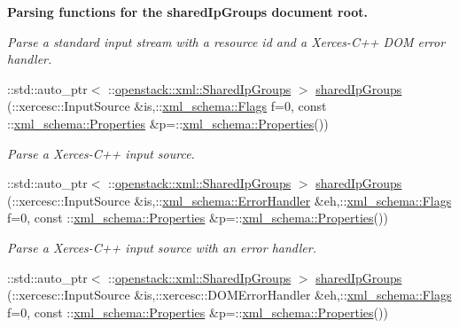 \begin{Indent}{\bf Parsing functions for the sharedIpGroups document root.}
\begin{DoxyCompactItemize}
\begin{DoxyCompactList}\small\item\em Parse a standard input stream with a resource id and a Xerces-\/C++ DOM error handler. \item\end{DoxyCompactList}\item 
::std::auto\_\-ptr$<$ ::\hyperlink{classopenstack_1_1xml_1_1SharedIpGroups}{openstack::xml::SharedIpGroups} $>$ \hyperlink{namespaceopenstack_1_1xml_a211f3fab7e8291970efefd9aa3fa8b4a}{sharedIpGroups} (::xercesc::InputSource \&is,::\hyperlink{namespacexml__schema_affb4c227cbd9aa7453dd1dc5a1401943}{xml\_\-schema::Flags} f=0, const ::\hyperlink{namespacexml__schema_ad27ce19a7ee1d3b1064092648898f64c}{xml\_\-schema::Properties} \&p=::\hyperlink{namespacexml__schema_ad27ce19a7ee1d3b1064092648898f64c}{xml\_\-schema::Properties}())
\begin{DoxyCompactList}\small\item\em Parse a Xerces-\/C++ input source. \item\end{DoxyCompactList}\item 
::std::auto\_\-ptr$<$ ::\hyperlink{classopenstack_1_1xml_1_1SharedIpGroups}{openstack::xml::SharedIpGroups} $>$ \hyperlink{namespaceopenstack_1_1xml_afff5bfc3d30dd6f81ba8b89efd949dcf}{sharedIpGroups} (::xercesc::InputSource \&is,::\hyperlink{namespacexml__schema_ab1c9361bfd3b404eaabf0c31eded79dc}{xml\_\-schema::ErrorHandler} \&eh,::\hyperlink{namespacexml__schema_affb4c227cbd9aa7453dd1dc5a1401943}{xml\_\-schema::Flags} f=0, const ::\hyperlink{namespacexml__schema_ad27ce19a7ee1d3b1064092648898f64c}{xml\_\-schema::Properties} \&p=::\hyperlink{namespacexml__schema_ad27ce19a7ee1d3b1064092648898f64c}{xml\_\-schema::Properties}())
\begin{DoxyCompactList}\small\item\em Parse a Xerces-\/C++ input source with an error handler. \item\end{DoxyCompactList}\item 
::std::auto\_\-ptr$<$ ::\hyperlink{classopenstack_1_1xml_1_1SharedIpGroups}{openstack::xml::SharedIpGroups} $>$ \hyperlink{namespaceopenstack_1_1xml_a87a069c8bf2815905223f9c46e41c2f2}{sharedIpGroups} (::xercesc::InputSource \&is,::xercesc::DOMErrorHandler \&eh,::\hyperlink{namespacexml__schema_affb4c227cbd9aa7453dd1dc5a1401943}{xml\_\-schema::Flags} f=0, const ::\hyperlink{namespacexml__schema_ad27ce19a7ee1d3b1064092648898f64c}{xml\_\-schema::Properties} \&p=::\hyperlink{namespacexml__schema_ad27ce19a7ee1d3b1064092648898f64c}{xml\_\-schema::Properties}())

\end{DoxyCompactItemize}
\end{Indent}
